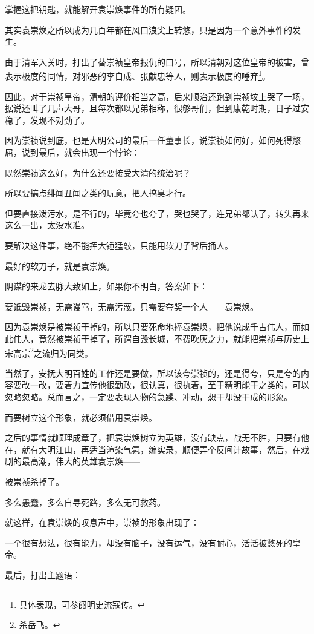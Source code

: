 \begin{multicols}{\theparacolNo}
		掌握这把钥匙，就能解开袁崇焕事件的所有疑团。

		其实袁崇焕之所以成为几百年都在风口浪尖上转悠，只是因为一个意外事件的发生。

		由于清军入关时，打出了替崇祯皇帝报仇的口号，所以清朝对这位皇帝的被害，曾表示极度的同情，对邪恶的李自成、张献忠等人，则表示极度的唾弃\footnote{具体表现，可参阅明史流寇传。}。

		因此，对于崇祯皇帝，清朝的评价相当之高，后来顺治还跑到崇祯坟上哭了一场，据说还叫了几声大哥，且每次都以兄弟相称，很够哥们，但到康乾时期，日子过安稳了，发现不对劲了。

		因为崇祯说到底，也是大明公司的最后一任董事长，说崇祯如何好，如何死得憋屈，说到最后，就会出现一个悖论：

		既然崇祯这么好，为什么还要接受大清的统治呢？

		所以要搞点绯闻丑闻之类的玩意，把人搞臭才行。

		但要直接泼污水，是不行的，毕竟夸也夸了，哭也哭了，连兄弟都认了，转头再来这么一出，太没水准。

		要解决这件事，绝不能挥大锤猛敲，只能用软刀子背后捅人。

		最好的软刀子，就是袁崇焕。

		阴谋的来龙去脉大致如上，如果你不明白，答案如下：

		要诋毁崇祯，无需谩骂，无需污蔑，只需要夸奖一个人——袁崇焕。

		因为袁崇焕是被崇祯干掉的，所以只要死命地捧袁崇焕，把他说成千古伟人，而如此伟人，竟然被崇祯干掉了，所谓自毁长城，不费吹灰之力，就能把崇祯与历史上宋高宗\footnote{杀岳飞。}之流归为同类。

		当然了，安抚大明百姓的工作还是要做，所以该夸崇祯的，还是得夸，只是夸的内容要改一改，要着力宣传他很勤政，很认真，很执着，至于精明能干之类的，可以忽略忽略。总而言之，一定要表现人物的急躁、冲动，想干却没干成的形象。

		而要树立这个形象，就必须借用袁崇焕。

		之后的事情就顺理成章了，把袁崇焕树立为英雄，没有缺点，战无不胜，只要有他在，就有大明江山，再适当渲染气氛，编实录，顺便弄个反间计故事，然后，在戏剧的最高潮，伟大的英雄袁崇焕——

		被崇祯杀掉了。

		多么愚蠢，多么自寻死路，多么无可救药。

		就这样，在袁崇焕的叹息声中，崇祯的形象出现了：

		一个很有想法，很有能力，却没有脑子，没有运气，没有耐心，活活被憋死的皇帝。

		最后，打出主题语：


\end{multicols}

